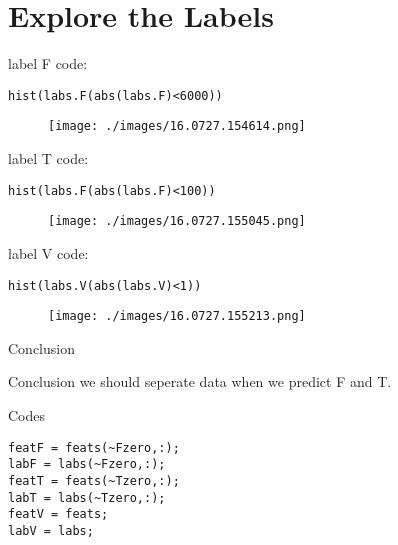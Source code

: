 \documentclass[bigger]{beamer}
\begin{document}
\section{Explore the Labels}
\label{sec-2}
\begin{frame}[fragile,label=sec-2-1]{label F}
 code:
\begin{verbatim}
hist(labs.F(abs(labs.F)<6000))
\end{verbatim}

\begin{figure}[htb]
\centering
\texttt{[image: ./images/16.0727.154614.png]}
\end{figure}
\end{frame}
\begin{frame}[fragile,label=sec-2-2]{label T}
 code:
\begin{verbatim}
hist(labs.F(abs(labs.F)<100))
\end{verbatim}

\begin{figure}[htb]
\centering
\texttt{[image: ./images/16.0727.155045.png]}
\end{figure}
\end{frame}
\begin{frame}[fragile,label=sec-2-3]{label V}
 code:
\begin{verbatim}
hist(labs.V(abs(labs.V)<1))
\end{verbatim}

\begin{figure}[htb]
\centering
\texttt{[image: ./images/16.0727.155213.png]}
\end{figure}
\end{frame}
\begin{frame}[fragile,label=sec-2-4]{Conclusion}
 \begin{block}{Conclusion}
we should seperate data when we predict F and T.
\end{block}
\begin{block}{Codes}
\begin{verbatim}
featF = feats(~Fzero,:);
labF = labs(~Fzero,:);
featT = feats(~Tzero,:);
labT = labs(~Tzero,:);
featV = feats;
labV = labs;
\end{verbatim}
\end{block}
\end{frame}
\end{document}
